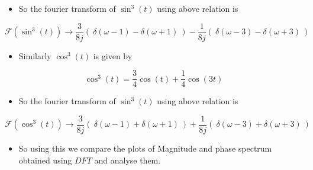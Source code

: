 \documentclass[11pt]{article}
\providecommand{\tightlist}{%
      \setlength{\itemsep}{0pt}\setlength{\parskip}{0pt}}
\begin{document}
\begin{itemize}
\tightlist
\item
  So the fourier transform of \(\sin^{3}(t)\) using above relation is
\end{itemize}

\begin{equation}
\mathscr{F}({\sin^{3}(t)})  \to \frac{3}{8j}(\ \delta(\omega -1) - \delta(\omega+1) \ ) - \frac{1}{8j}(\ \delta(\omega -3) - \delta(\omega+3) \ )
\end{equation}

\begin{itemize}
\tightlist
\item
  Similarly \(\cos^{3}(t)\) is given by
\end{itemize}

\begin{equation}
\cos^{3}(t) = \frac{3}{4}\cos(t) + \frac{1}{4}\cos(3t)
\end{equation}

\begin{itemize}
\tightlist
\item
  So the fourier transform of \(\sin^{3}(t)\) using above relation is
\end{itemize}

\begin{equation}
\mathscr{F}({\cos^{3}(t)})  \to \frac{3}{8j}(\ \delta(\omega -1) + \delta(\omega+1) \ ) + \frac{1}{8j}(\ \delta(\omega -3) + \delta(\omega+3) \ )
\end{equation}

\begin{itemize}
\tightlist
\item
  So using this we compare the plots of Magnitude and phase spectrum
  obtained using \(DFT\) and analyse them.
\end{itemize}

	

	
		
	
	
		
	
		
			
		
	
		
			
		
	
		
			
		
	
		
			
		
	
		
			
		
	
\end{document}
